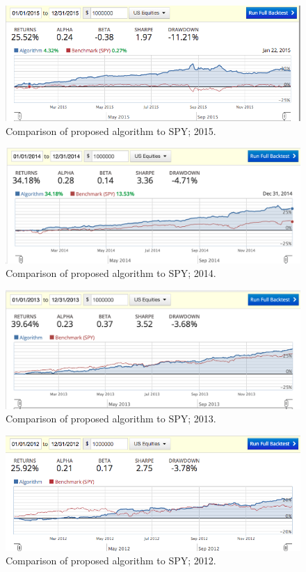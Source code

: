 \documentclass{article}
\begin{document}
\begin{case}
\begin{figure}\label{fig:backtest-2015}
\includegraphics[bb=0 0 640 480]{figures/mad_mfd_macd_2015.png}
\caption{Comparison of proposed algorithm to SPY; 2015.}  
\end{figure}

\begin{figure}\label{fig:backtest-2014}
\includegraphics[bb=0 0 640 480]{figures/mad_mfd_macd_2014.png}
\caption{Comparison of proposed algorithm to SPY; 2014.}  
\end{figure}

\begin{figure}\label{fig:backtest-2013}
\includegraphics[bb=0 0 640 480]{figures/mad_mfd_macd_2013.png}
\caption{Comparison of proposed algorithm to SPY; 2013.}  
\end{figure}

\begin{figure}\label{fig:backtest-2012}
\includegraphics[bb=0 0 640 480]{figures/mad_mfd_macd_2012.png}
\caption{Comparison of proposed algorithm to SPY; 2012.}  
\end{figure}


\end{case}
\end{document}
